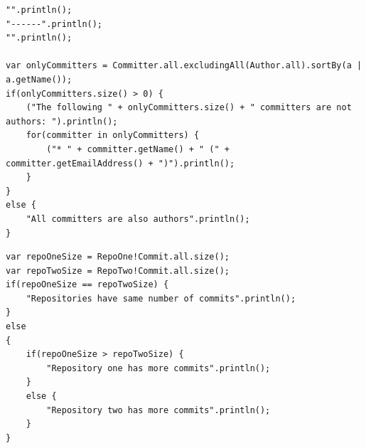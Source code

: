 \documentclass[11pt]{book}
\begin{document}
\begin{appendices}
\begin{lstlisting}[caption=Author vs Committer Information, label=lst:authorvscommitter]
"".println();
"------".println();
"".println();

var onlyCommitters = Committer.all.excludingAll(Author.all).sortBy(a | a.getName());
if(onlyCommitters.size() > 0) {
	("The following " + onlyCommitters.size() + " committers are not authors: ").println();
	for(committer in onlyCommitters) {
		("* " + committer.getName() + " (" + committer.getEmailAddress() + ")").println();
	}
}
else {
	"All committers are also authors".println();
}
\end{lstlisting}
\clearpage
\begin{lstlisting}[caption=Author vs Committer Information, label=lst:multirepos]
var repoOneSize = RepoOne!Commit.all.size();
var repoTwoSize = RepoTwo!Commit.all.size();
if(repoOneSize == repoTwoSize) {
	"Repositories have same number of commits".println();
}
else
{
	if(repoOneSize > repoTwoSize) {
		"Repository one has more commits".println();
	}
	else {
		"Repository two has more commits".println();
	}
}
\end{lstlisting}

\end{appendices}
\end{document}
